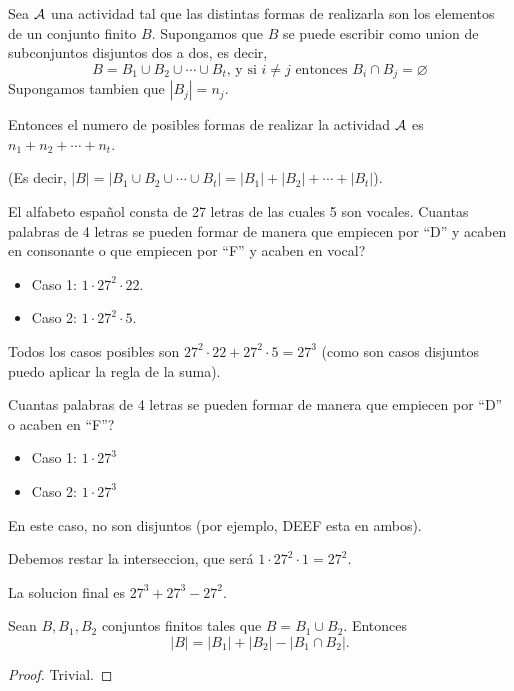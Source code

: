 \begin{proposition}
	Sea \(\mathcal{\MakeUppercase{a}} \) una actividad tal que las distintas formas de realizarla son los elementos de un conjunto finito \(B \). Supongamos que \(B \) se puede escribir como union de subconjuntos disjuntos dos a dos, es decir,
	\[
		B = B_1 \cup B_2 \cup \cdots \cup B_t \text{, y si } i \neq j \text{ entonces } B_i \cap B_j = \varnothing
	\]
	Supongamos tambien que \(|B_j| = n_j \).

	Entonces el numero de posibles formas de realizar la actividad \(\mathcal{\MakeUppercase{a}} \) es \(n_1 + n_2 + \cdots + n_t\).

	(Es decir, \(|B| = |B_1 \cup B_2 \cup \cdots \cup B_t| = |B_1| + |B_2| + \cdots + |B_t| \)).
\end{proposition}

\begin{example}
	El alfabeto español consta de 27 letras de las cuales 5 son vocales. Cuantas palabras de 4 letras se pueden formar de manera que empiecen por ``D'' y acaben en consonante o que empiecen por ``F'' y acaben en vocal?

	\begin{itemize}
		\item Caso 1: \(1 \cdot 27^{2} \cdot 22\).
		\item Caso 2: \(1 \cdot 27^{2} \cdot 5\).
	\end{itemize}
	Todos los casos posibles son \(27^{2} \cdot 22 + 27^{2} \cdot 5 = 27^{3} \) (como son casos disjuntos puedo aplicar la regla de la suma).
\end{example}

\begin{example}
	Cuantas palabras de 4 letras se pueden formar de manera que empiecen por ``D'' o acaben en ``F''?

	\begin{itemize}
		\item Caso 1: \(1 \cdot 27^{3}\)
		\item Caso 2: \(1 \cdot 27^{3 } \)
	\end{itemize}
	En este caso, no son disjuntos (por ejemplo, DEEF esta en ambos).

	Debemos restar la interseccion, que será \(1 \cdot 27^{2} \cdot 1 = 27^{2}  \).

	La solucion final es \(27^{3} + 27^{3} - 27^{2}\).
\end{example}

\begin{theorem}
	Sean \(B, B_1, B_2 \) conjuntos finitos tales que \(B= B_1 \cup B_2 \). Entonces
	\[
		|B| = |B_1| + |B_2| - |B_1 \cap B_2|.
	\]
\end{theorem}
\begin{proof}
	Trivial.
\end{proof}

